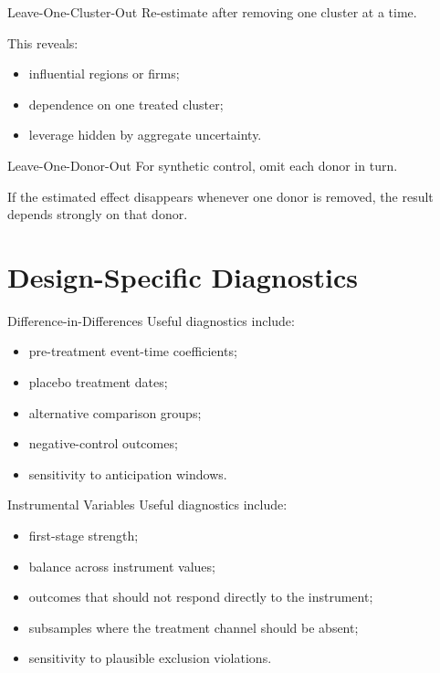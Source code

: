 \documentclass[aspectratio=169,11pt]{beamer}
\begin{document}
\begin{frame}{Leave-One-Cluster-Out}
Re-estimate after removing one cluster at a time.

This reveals:
\begin{itemize}
\item influential regions or firms;
\item dependence on one treated cluster;
\item leverage hidden by aggregate uncertainty.
\end{itemize}
\end{frame}

\begin{frame}{Leave-One-Donor-Out}
For synthetic control, omit each donor in turn.

If the estimated effect disappears whenever one donor is removed, the result depends strongly on that donor.
\end{frame}

\section{Design-Specific Diagnostics}

\begin{frame}{Difference-in-Differences}
Useful diagnostics include:
\begin{itemize}
\item pre-treatment event-time coefficients;
\item placebo treatment dates;
\item alternative comparison groups;
\item negative-control outcomes;
\item sensitivity to anticipation windows.
\end{itemize}
\end{frame}

\begin{frame}{Instrumental Variables}
Useful diagnostics include:
\begin{itemize}
\item first-stage strength;
\item balance across instrument values;
\item outcomes that should not respond directly to the instrument;
\item subsamples where the treatment channel should be absent;
\item sensitivity to plausible exclusion violations.
\end{itemize}
\end{frame}
\end{document}
